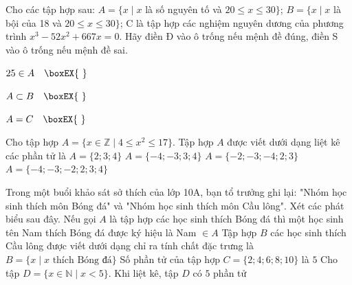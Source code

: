 \begin{bt}%
	Cho các tập hợp sau:
	$A=\{x \mid x$ là số nguyên tố và $20 \leq x \leq 30\}$;
	$B=\{x \mid x$ là bội của 18 và $20 \leq x \leq 30\}$;
	C là tập hợp các nghiệm nguyên dương của phương trình $x^{3}-52 x^{2}+667 x=0$. Hãy điền Đ vào ô trống nếu mệnh đề đúng, điền S vào ô trống nếu mệnh đề sai.
	\begin{listEX}[3]
		\item 	$25 \in A\quad \boxEX{~}$
		\item 	$A \subset B\quad \boxEX{~}$
		\item 	$A=C\quad \boxEX{~}$
	\end{listEX}
\end{bt}

\begin{ex}%
	Cho tập hợp $A=\{x\in\mathbb{Z}\mid 4\le x^2\le 17\}$. Tập hợp $A$ được viết dưới dạng liệt kê các phần tử là
	\choice
		{$A=\{2;3;4\}$}
		{$A=\{-4;-3;3;4\}$}
		{$A=\{-2;-3;-4;2;3\}$}
		{\True $A=\{-4;-3;-2;2;3;4\}$}
\end{ex}

\begin{ex}%
	Trong một buổi khảo sát sở thích của lớp 10A, bạn tổ trưởng ghi lại: "Nhóm học sinh thích môn Bóng đá" và "Nhóm học sinh thích môn Cầu lông". Xét các phát biểu sau đây.
	\choiceTF
		{\True Nếu gọi $A$ là tập hợp các học sinh thích Bóng đá thì một học sinh tên Nam thích Bóng đá được ký hiệu là Nam $\in A$}
		{Tập hợp $B$ các học sinh thích Cầu lông được viết dưới dạng chỉ ra tính chất đặc trưng là $B=\{x \mid x \text{ thích Bóng đá}\}$}
		{\True Số phần tử của tập hợp $C=\{2;4;6;8;10\}$ là $5$}
		{\True Cho tập $D=\{x\in\mathbb{N} \mid x<5\}$. Khi liệt kê, tập $D$ có $5$ phần tử}
\end{ex}

